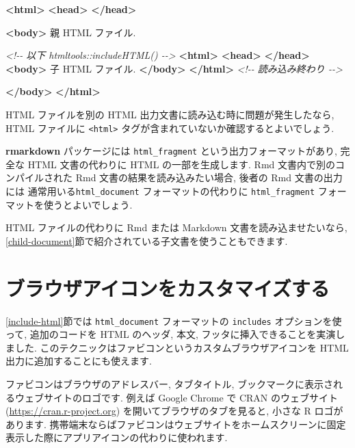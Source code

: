 \documentclass[
  11pt,
  lualatex,
  ja=standard]{bxjsreport}
\newenvironment{Shaded}{\begin{snugshade}}{\end{snugshade}}
\newcommand{\CommentTok}[1]{\textcolor[rgb]{0.56,0.35,0.01}{\textit{#1}}}
\newcommand{\KeywordTok}[1]{\textcolor[rgb]{0.13,0.29,0.53}{\textbf{#1}}}
\newcommand{\NormalTok}[1]{#1}
\begin{document}
\begin{Shaded}
\begin{Highlighting}[]
\KeywordTok{\textless{}html\textgreater{}}
  \KeywordTok{\textless{}head\textgreater{}}  \KeywordTok{\textless{}/head\textgreater{}}

  \KeywordTok{\textless{}body\textgreater{}}
\NormalTok{  親 HTML ファイル.}

  \CommentTok{\textless{}!{-}{-} 以下 htmltools::includeHTML() {-}{-}\textgreater{}}
    \KeywordTok{\textless{}html\textgreater{}}
      \KeywordTok{\textless{}head\textgreater{}}  \KeywordTok{\textless{}/head\textgreater{}}
      \KeywordTok{\textless{}body\textgreater{}}
\NormalTok{      子 HTML ファイル.}
      \KeywordTok{\textless{}/body\textgreater{}}
    \KeywordTok{\textless{}/html\textgreater{}}
  \CommentTok{\textless{}!{-}{-} 読み込み終わり {-}{-}\textgreater{}}

  \KeywordTok{\textless{}/body\textgreater{}}
\KeywordTok{\textless{}/html\textgreater{}}
\end{Highlighting}
\end{Shaded}

HTML ファイルを別の HTML 出力文書に読み込む時に問題が発生したなら, HTML ファイルに \texttt{\textless{}html\textgreater{}} タグが含まれていないか確認するとよいでしょう.

\textbf{rmarkdown} パッケージには \texttt{html\_fragment} という出力フォーマットがあり, 完全な HTML 文書の代わりに HTML の一部を生成します. Rmd 文書内で別のコンパイルされた Rmd 文書の結果を読み込みたい場合, 後者の Rmd 文書の出力には 通常用いる\texttt{html\_document} フォーマットの代わりに \texttt{html\_fragment} フォーマットを使うとよいでしょう.

HTML ファイルの代わりに Rmd または Markdown 文書を読み込ませたいなら, \ref{child-document}節で紹介されている子文書を使うこともできます.

\hypertarget{favicon}{%
\section{ブラウザアイコンをカスタマイズする}\label{favicon}}

\ref{include-html}節では \texttt{html\_document} フォーマットの \texttt{includes} オプションを使って, 追加のコードを HTML のヘッダ, 本文, フッタに挿入できることを実演しました. このテクニックはファビコンというカスタムブラウザアイコンを HTML 出力に追加することにも使えます.

ファビコンはブラウザのアドレスバー, タブタイトル, ブックマークに表示されるウェブサイトのロゴです. 例えば Google Chrome で CRAN のウェブサイト (\url{https://cran.r-project.org}) を開いてブラウザのタブを見ると, 小さな R ロゴがあります. 携帯端末ならばファビコンはウェブサイトをホームスクリーンに固定表示した際にアプリアイコンの代わりに使われます.
\end{document}
